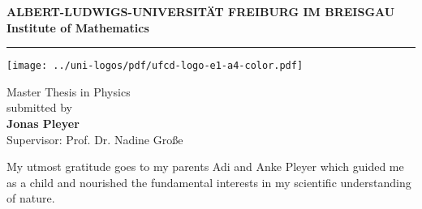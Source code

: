 \begin{titlepage}
\thispagestyle{empty}
\begin{center}
 
\Large\textbf{ALBERT-LUDWIGS-UNIVERSITÄT FREIBURG IM BREISGAU\\}
\vspace{0.5cm}
\Large\textbf{Institute of Mathematics}

\rule{\textwidth}{1pt}
\vspace{1.5cm}

\Large\textbf{\Title}

\vspace{1.5cm}

\texttt{[image: ../uni-logos/pdf/ufcd-logo-e1-a4-color.pdf]}

\vfill

\normalsize
Master Thesis in Physics\\
\vspace{0.5cm}
submitted \Date\hspace{0pt} by\\
\vspace{0.5cm}
\Large\textbf{Jonas Pleyer}\\
\normalsize
\vspace{0.5cm}
\large Supervisor: Prof. Dr. Nadine Große\\
\normalsize

\newpage
\thispagestyle{empty}

\vfill

\normalsize
My utmost gratitude goes to my parents Adi and Anke Pleyer which guided me as a child and nourished the fundamental interests in my scientific understanding of nature.

\end{center}

\end{titlepage}
\thispagestyle{empty}
